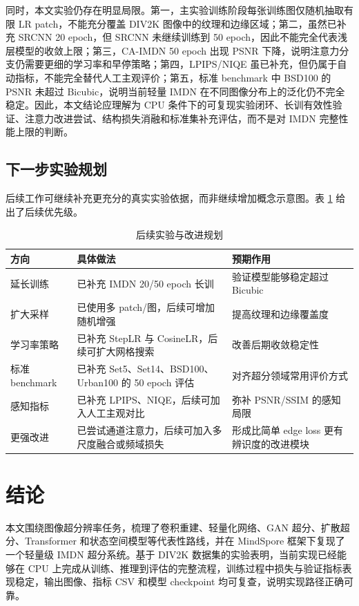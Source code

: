 \documentclass[bwprint]{report}
\begin{document}
同时，本文实验仍存在明显局限。第一，主实验训练阶段每张训练图仅随机抽取有限 LR patch，不能充分覆盖 DIV2K 图像中的纹理和边缘区域；第二，虽然已补充 SRCNN 20 epoch，但 SRCNN 未继续训练到 50 epoch，因此不能完全代表浅层模型的收敛上限；第三，CA-IMDN 50 epoch 出现 PSNR 下降，说明注意力分支仍需要更细的学习率和早停策略；第四，LPIPS/NIQE 虽已补充，但仍属于自动指标，不能完全替代人工主观评价；第五，标准 benchmark 中 BSD100 的 PSNR 未超过 Bicubic，说明当前轻量 IMDN 在不同图像分布上的泛化仍不完全稳定。因此，本文结论应理解为 CPU 条件下的可复现实验闭环、长训有效性验证、注意力改进尝试、结构损失消融和标准集补充评估，而不是对 IMDN 完整性能上限的判断。

\subsection{下一步实验规划}
后续工作可继续补充更充分的真实实验依据，而非继续增加概念示意图。表 \ref{tab:next-plan} 给出了后续优先级。

\begin{table}[H]
    \centering
    \caption{后续实验与改进规划}
    \label{tab:next-plan}
    \small
    \begin{tabular}{>{\raggedright\arraybackslash}p{3.1cm}>{\raggedright\arraybackslash}p{4.5cm}>{\raggedright\arraybackslash}p{3.7cm}}
        \toprule
        方向 & 具体做法 & 预期作用 \\
        \midrule
        延长训练 & 已补充 IMDN 20/50 epoch 长训 & 验证模型能够稳定超过 Bicubic \\
        扩大采样 & 已使用多 patch/图，后续可增加随机增强 & 提高纹理和边缘覆盖度 \\
        学习率策略 & 已补充 StepLR 与 CosineLR，后续可扩大网格搜索 & 改善后期收敛稳定性 \\
        标准 benchmark & 已补充 Set5、Set14、BSD100、Urban100 的 50 epoch 评估 & 对齐超分领域常用评价方式 \\
        感知指标 & 已补充 LPIPS、NIQE，后续可加入人工主观对比 & 弥补 PSNR/SSIM 的感知局限 \\
        更强改进 & 已尝试通道注意力，后续可加入多尺度融合或频域损失 & 形成比简单 edge loss 更有辨识度的改进模块 \\
        \bottomrule
    \end{tabular}
\end{table}

\section{结论}
本文围绕图像超分辨率任务，梳理了卷积重建、轻量化网络、GAN 超分、扩散超分、Transformer 和状态空间模型等代表性路线，并在 MindSpore 框架下复现了一个轻量级 IMDN 超分系统。基于 DIV2K 数据集的实验表明，当前实现已经能够在 CPU 上完成从训练、推理到评估的完整流程，训练过程中损失与验证指标表现稳定，输出图像、指标 CSV 和模型 checkpoint 均可复查，说明实现路径正确可靠。
\end{document}
